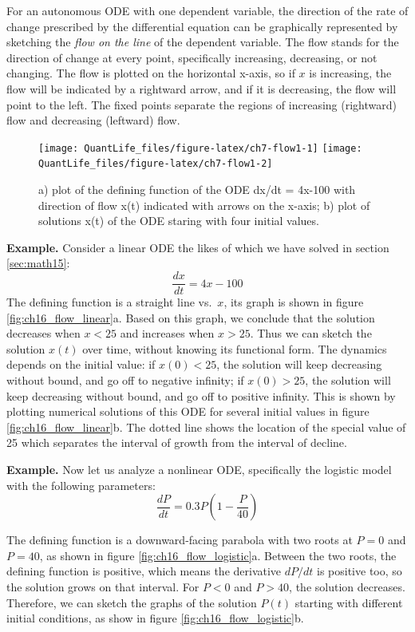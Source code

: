\documentclass[
]{book}
\theoremstyle{definition}
\theoremstyle{definition}
\theoremstyle{definition}
\theoremstyle{remark}
\begin{document}
For an autonomous ODE with one dependent variable, the direction of the rate of change prescribed by the differential equation can be graphically represented by sketching the  \emph{flow on the line} of the dependent variable. The flow stands for the direction of change at every point, specifically increasing, decreasing, or not changing. The flow is plotted on the horizontal x-axis, so if \(x\) is increasing, the flow will be indicated by a rightward arrow, and if it is decreasing, the flow will point to the left. The fixed points separate the regions of increasing (rightward) flow and decreasing (leftward) flow.

\begin{figure}

{\centering \texttt{[image: QuantLife\_files/figure-latex/ch7-flow1-1]} \texttt{[image: QuantLife\_files/figure-latex/ch7-flow1-2]} 

}

\caption{a) plot of the defining function of the ODE dx/dt = 4x-100 with direction of flow x(t) indicated with arrows on the x-axis; b) plot of solutions x(t) of the ODE staring with four initial values.}\label{fig:ch7-flow1}
\end{figure}

\textbf{Example.} Consider a linear ODE the likes of which we have solved in section \ref{sec:math15}:
\[\frac{dx}{dt} = 4x -100\]
The defining function is a straight line vs.~\(x\), its graph is shown in figure \ref{fig:ch16_flow_linear}a. Based on this graph, we conclude that the solution decreases when \(x<25\) and increases when \(x>25\). Thus we can sketch the solution \(x(t)\) over time, without knowing its functional form. The dynamics depends on the initial value: if \(x(0)<25\), the solution will keep decreasing without bound, and go off to negative infinity; if \(x(0)>25\), the solution will keep decreasing without bound, and go off to positive infinity. This is shown by plotting numerical solutions of this ODE for several initial values in figure \ref{fig:ch16_flow_linear}b. The dotted line shows the location of the special value of 25 which separates the interval of growth from the interval of decline.

\textbf{Example.} Now let us analyze a nonlinear ODE, specifically the logistic model with the following parameters:
\[\frac{dP}{dt} =0.3P\left(1-\frac{P}{40}\right)\]

The defining function is a downward-facing parabola with two roots at \(P=0\) and \(P=40\), as shown in figure \ref{fig:ch16_flow_logistic}a. Between the two roots, the defining function is positive, which means the derivative \(dP/dt\) is positive too, so the solution grows on that interval. For \(P<0\) and \(P>40\), the solution decreases. Therefore, we can sketch the graphs of the solution \(P(t)\) starting with different initial conditions, as show in figure \ref{fig:ch16_flow_logistic}b.
\end{document}

